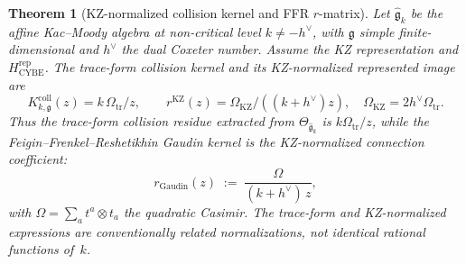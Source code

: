 \documentclass[11pt]{article}
\theoremstyle{plain}
\newtheorem{theorem}{Theorem}[section]
\theoremstyle{definition}
\theoremstyle{remark}
\newcommand{\fg}{\mathfrak{g}}
\numberwithin{equation}{section}
\begin{document}
\begin{theorem}[KZ-normalized collision kernel and FFR $r$-matrix]
\label{thm:gaudin-r-matrix-identification}
Let $\widehat{\fg}_k$ be the affine Kac--Moody
algebra at non-critical level $k \neq -h^\vee$, with
$\fg$ simple finite-dimensional and $h^\vee$ the dual Coxeter number.
Assume the KZ representation and $H_{\mathrm{CYBE}}^{\mathrm{rep}}$.
The trace-form collision kernel and its KZ-normalized represented image
are
\[
K^{\mathrm{coll}}_{k,\fg}(z)=k\,\Omega_{\mathrm{tr}}/z,
\qquad
r^{\mathrm{KZ}}(z)=\Omega_{\mathrm{KZ}}/((k+h^\vee)z),
\quad
\Omega_{\mathrm{KZ}}=2h^\vee\Omega_{\mathrm{tr}}.
\]
Thus the trace-form collision residue extracted from
\(\Theta_{\widehat{\fg}_k}\) is \(k\Omega_{\mathrm{tr}}/z\), while the
Feigin--Frenkel--Reshetikhin Gaudin kernel is the KZ-normalized
connection coefficient:
\begin{equation}\label{eq:ffr-identification}
 r_{\mathrm{Gaudin}}(z)
 \;:=\;
 \frac{\Omega}{(k + h^\vee)\, z},
\end{equation}
with $\Omega = \sum_a t^a \otimes t_a$ the quadratic Casimir. The
trace-form and KZ-normalized expressions are conventionally related
normalizations, not identical rational functions of~$k$.
\end{theorem}
\end{document}

